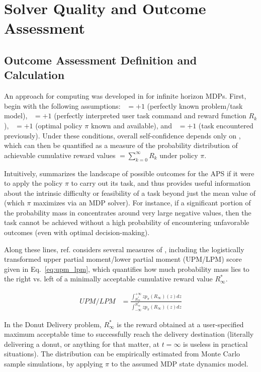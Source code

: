 \section{Solver Quality and Outcome Assessment}
    
\subsection{Outcome Assessment Definition and Calculation} \label{sec:xO}
An approach for computing \xO{} was developed in \cite{Aitken2016-cv} for infinite horizon MDPs. First, begin with the following assumptions: \xM~$=+1$ (perfectly known problem/task model), \xI~$= +1$ (perfectly interpreted user task command and reward function $R_k$), \xQ~$=+1$ (optimal policy $\pi$ known and available), and \xP~$=+1$ (task encountered previously). Under these conditions, overall self-confidence depends only on \xO{}, which can then be quantified as a measure of the probability distribution \ppiri of achievable cumulative reward values $ $\ri$= \sum_{k=0}^{\infty}R_{k}$ under policy $\pi$.

Intuitively, \ppiri summarizes the landscape of possible outcomes for the APS if it were to apply the policy $\pi$ to carry out its task, and thus provides useful information about the intrinsic difficulty or feasibility of a task beyond just the mean value of \ri{} (which $\pi$ maximizes via an MDP solver). For instance, if a significant portion of the probability mass in \ppiri concentrates around very large negative values, then the task cannot be achieved without a high probability of encountering unfavorable outcomes (even with optimal decision-making). 

Along these lines, ref. \cite{Aitken2016-cv} considers several measures of \ppiri, including the logistically transformed upper partial moment/lower partial moment (UPM/LPM) score given in Eq.~\ref{eq:upm_lpm}, which quantifies how much probability mass lies to the right vs. left of a minimally acceptable cumulative reward value $R^*_{\infty}$.

    \begin{align}
        UPM/LPM &= \frac{\int_{R^*_{\infty}}^{+\infty}zp_{\pi}(R_{\infty})(z)dz}{\int_{-\infty}^{R^*_{\infty}} zp_{\pi}(R_{\infty})(z)dz} \label{eq:upm_lpm}
    \end{align}

In the Donut Delivery problem, $R^*_{\infty}$ is the reward obtained at a user-specified maximum acceptable time to successfully reach the delivery destination (literally delivering a donut, or anything for that matter, at $t=\infty$ is useless in practical situations). The distribution \ppiri can be empirically estimated from Monte Carlo sample simulations, by applying $\pi$ to the assumed MDP state dynamics model.

